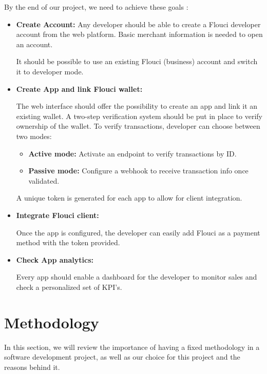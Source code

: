 \begin{spacing}{1.2}
By the end of our project, we need to achieve these goals :
\begin{itemize}
  \item \textbf{Create Account:}
  Any developer should be able to create a Flouci developer account from the web platform. Basic merchant information is needed to open an account.

  It should be possible to use an existing Flouci (business) account and switch it to developer mode.
  \item \textbf{Create App and link Flouci wallet:}

  The web interface should offer the possibility to create an app and link it an existing wallet. A two-step verification system should be put in place to verify ownership of the wallet.
  To verify transactions, developer can choose between two modes:
  \begin{itemize}
  \item \textbf{Active mode:} Activate an endpoint to verify transactions by ID.
  \item \textbf{Passive mode:} Configure a webhook to receive transaction info once validated.
   \end{itemize}
   A unique token is generated for each app to allow for client integration.
  \item \textbf{Integrate Flouci client:}

 Once the app is configured, the developer can easily add Flouci as a payment method with the token provided.
  \item \textbf{Check App analytics:}

  Every app should enable a dashboard for the developer to monitor sales and check a personalized set of KPI's.
\end{itemize}
\section{Methodology}

In this section, we will review the importance of having a fixed methodology in a software development project, as well as our choice for this project and the reasons behind it.

\end{spacing}

